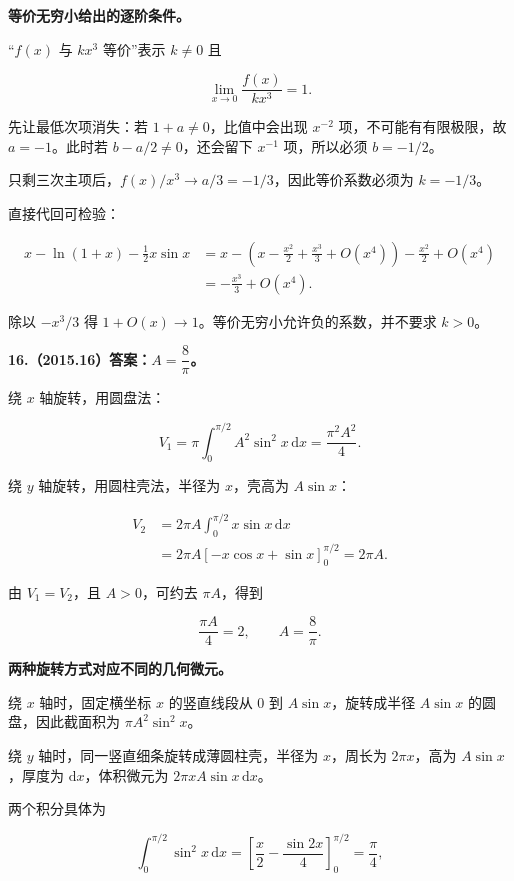 \documentclass[UTF8,11pt,fontset=windows]{ctexart}
\begin{document}
\textbf{等价无穷小给出的逐阶条件。}

“$f(x)$ 与 $kx^3$ 等价”表示 $k\ne0$ 且

$$
\lim_{x\to0}\frac{f(x)}{kx^3}=1.
$$

先让最低次项消失：若 $1+a\ne0$，比值中会出现 $x^{-2}$ 项，不可能有有限极限，故 $a=-1$。此时若 $b-a/2\ne0$，还会留下 $x^{-1}$ 项，所以必须 $b=-1/2$。

只剩三次主项后，$f(x)/x^3\to a/3=-1/3$，因此等价系数必须为 $k=-1/3$。

直接代回可检验：

$$
\begin{aligned}
x-\ln(1+x)-\frac12x\sin x
&=x-\left(x-\frac{x^2}{2}+\frac{x^3}{3}+O(x^4)\right)
-\frac{x^2}{2}+O(x^4)\\
&=-\frac{x^3}{3}+O(x^4).
\end{aligned}
$$

除以 $-x^3/3$ 得 $1+O(x)\to1$。等价无穷小允许负的系数，并不要求 $k>0$。

\clearpage

\textbf{16.（2015.16）答案：$A=\dfrac8\pi$。}

绕 $x$ 轴旋转，用圆盘法：

$$
V_1=\pi\int_0^{\pi/2}A^2\sin^2x\,\mathrm dx
=\frac{\pi^2A^2}{4}.
$$

绕 $y$ 轴旋转，用圆柱壳法，半径为 $x$，壳高为 $A\sin x$：

$$
\begin{aligned}
V_2&=2\pi A\int_0^{\pi/2}x\sin x\,\mathrm dx\\
&=2\pi A\left[-x\cos x+\sin x\right]_0^{\pi/2}
=2\pi A.
\end{aligned}
$$

由 $V_1=V_2$，且 $A>0$，可约去 $\pi A$，得到

$$
\frac{\pi A}{4}=2,
\qquad A=\frac8\pi.
$$

\textbf{两种旋转方式对应不同的几何微元。}

绕 $x$ 轴时，固定横坐标 $x$ 的竖直线段从 $0$ 到 $A\sin x$，旋转成半径 $A\sin x$ 的圆盘，因此截面积为 $\pi A^2\sin^2x$。

绕 $y$ 轴时，同一竖直细条旋转成薄圆柱壳，半径为 $x$，周长为 $2\pi x$，高为 $A\sin x$，厚度为 $\mathrm dx$，体积微元为 $2\pi x A\sin x\,\mathrm dx$。

两个积分具体为

$$
\int_0^{\pi/2}\sin^2x\,\mathrm dx
=\left[\frac x2-\frac{\sin2x}{4}\right]_0^{\pi/2}
=\frac\pi4,
$$
\end{document}
